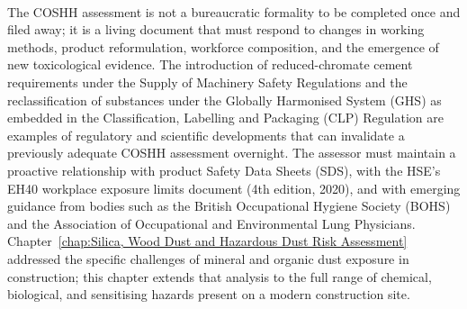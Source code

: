 \paragraph{}
The COSHH assessment is not a bureaucratic formality to be completed once and filed away; it is a living document that must respond to changes in working methods, product reformulation, workforce composition, and the emergence of new toxicological evidence. The introduction of reduced-chromate cement requirements under the Supply of Machinery Safety Regulations and the reclassification of substances under the Globally Harmonised System (GHS) as embedded in the Classification, Labelling and Packaging (CLP) Regulation are examples of regulatory and scientific developments that can invalidate a previously adequate COSHH assessment overnight. The assessor must maintain a proactive relationship with product Safety Data Sheets (SDS), with the HSE's EH40 workplace exposure limits document (4th edition, 2020), and with emerging guidance from bodies such as the British Occupational Hygiene Society (BOHS) and the Association of Occupational and Environmental Lung Physicians. Chapter~\ref{chap:Silica, Wood Dust and Hazardous Dust Risk Assessment} addressed the specific challenges of mineral and organic dust exposure in construction; this chapter extends that analysis to the full range of chemical, biological, and sensitising hazards present on a modern construction site.


